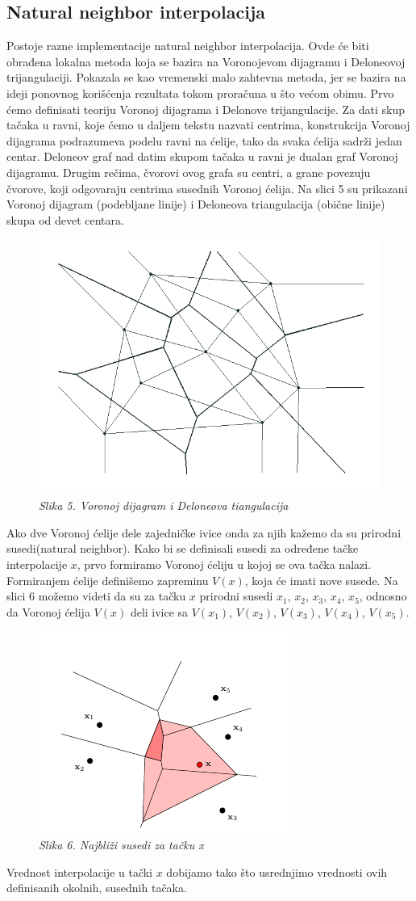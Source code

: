 \documentclass[12pt]{article}
\begin{document}
\subsection{Natural neighbor interpolacija}
Postoje razne implementacije natural neighbor interpolacija. Ovde će biti obrađena lokalna metoda koja se bazira na Voronojevom dijagramu i Deloneovoj trijangulaciji. Pokazala se kao vremenski malo zahtevna metoda, jer se bazira na ideji ponovnog korišćenja rezultata tokom proračuna u što većom obimu. Prvo ćemo definisati teoriju Voronoj dijagrama i Delonove trijangulacije.
Za dati skup tačaka u ravni, koje ćemo u daljem tekstu nazvati centrima, konstrukcija Voronoj dijagrama podrazumeva podelu ravni na ćelije, tako da svaka ćelija sadrži jedan centar. Deloneov graf nad datim skupom tačaka u ravni je dualan graf Voronoj dijagramu. Drugim rečima, čvorovi ovog grafa su centri, a grane povezuju čvorove, koji odgovaraju centrima susednih Voronoj ćelija. Na slici 5 su prikazani
Voronoj dijagram (podebljane linije) i Deloneova triangulacija (obične linije) skupa od devet centara.
\begin{figure}[h!]
	\centering
	\includegraphics[width=0.5\linewidth]{vor.png}
	\caption*{\textsl{Slika 5. Voronoj dijagram i Deloneova tiangulacija}}
\end{figure} 
Ako dve Voronoj ćelije dele zajedničke ivice onda za njih kažemo da su prirodni susedi(natural neighbor). Kako bi se definisali susedi za određene tačke interpolacije $x$, prvo formiramo Voronoj ćeliju u kojoj se ova tačka nalazi. Formiranjem ćelije definišemo zapreminu $V(x)$, koja će imati nove susede. Na slici 6 možemo videti da su za tačku $x$ prirodni susedi $x_{1}$, $x_{2}$, $x_{3}$, $x_{4}$, $x_{5}$, odnosno da Voronoj ćelija $V(x)$ deli ivice sa $V(x_1)$, $V(x_2)$, $V(x_3)$, $V(x_4)$, $V(x_5)$.    
\begin{figure}[h!]
\centering
\includegraphics[width=0.6\linewidth]{slika6.png}
\caption*{\textsl{Slika 6. Najbliži susedi za tačku x}}
\end{figure}
Vrednost interpolacije u tački $x$ dobijamo tako što usrednjimo vrednosti ovih definisanih okolnih, susednih tačaka. 
\end{document}

